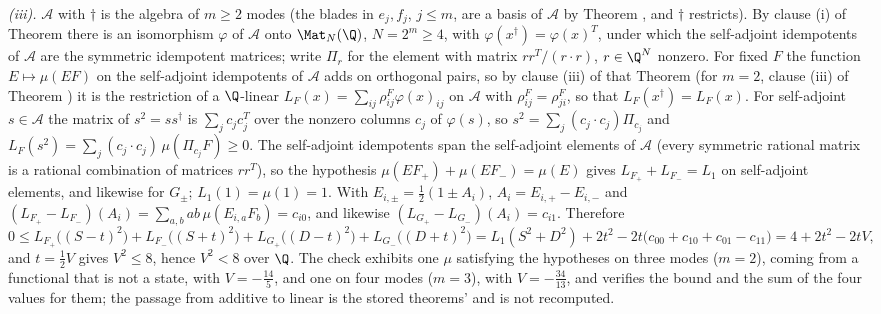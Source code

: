 \emph{(iii).} $\mathcal{A}$ with $\dagger$ is the algebra of $m \ge 2$ modes (the blades in $e_{j}, f_{j}$, $j \le m$, are a basis of $\mathcal{A}$ by Theorem , and $\dagger$ restricts). By clause (i) of Theorem  there is an isomorphism $\varphi$ of $\mathcal{A}$ onto $\Mat_{N}(\Q)$, $N = 2^{m} \ge 4$, with $\varphi(x^{\dagger}) = \varphi(x)^{T}$, under which the self-adjoint idempotents of $\mathcal{A}$ are the symmetric idempotent matrices; write $\Pi_{r}$ for the element with matrix $rr^{T}/(r \cdot r)$, $r \in \Q^{N}$ nonzero. For fixed $F$ the function $E \mapsto \mu(EF)$ on the self-adjoint idempotents of $\mathcal{A}$ adds on orthogonal pairs, so by clause (iii) of that Theorem (for $m = 2$, clause (iii) of Theorem ) it is the restriction of a $\Q$-linear $L_{F}(x) = \sum_{ij}\rho^{F}_{ij}\varphi(x)_{ij}$ on $\mathcal{A}$ with $\rho^{F}_{ij} = \rho^{F}_{ji}$, so that $L_{F}(x^{\dagger}) = L_{F}(x)$. For self-adjoint $s \in \mathcal{A}$ the matrix of $s^{2} = ss^{\dagger}$ is $\sum_{j}c_{j}c_{j}^{T}$ over the nonzero columns $c_{j}$ of $\varphi(s)$, so $s^{2} = \sum_{j}(c_{j} \cdot c_{j})\Pi_{c_{j}}$ and $L_{F}(s^{2}) = \sum_{j}(c_{j} \cdot c_{j})\,\mu(\Pi_{c_{j}}F) \ge 0$. The self-adjoint idempotents span the self-adjoint elements of $\mathcal{A}$ (every symmetric rational matrix is a rational combination of matrices $rr^{T}$), so the hypothesis $\mu(EF_{+}) + \mu(EF_{-}) = \mu(E)$ gives $L_{F_{+}} + L_{F_{-}} = L_{1}$ on self-adjoint elements, and likewise for $G_{\pm}$; $L_{1}(1) = \mu(1) = 1$. With $E_{i,\pm} = \tfrac12(1 \pm A_{i})$, $A_{i} = E_{i,+} - E_{i,-}$ and $(L_{F_{+}} - L_{F_{-}})(A_{i}) = \sum_{a,b}ab\,\mu(E_{i,a}F_{b}) = c_{i0}$, and likewise $(L_{G_{+}} - L_{G_{-}})(A_{i}) = c_{i1}$. Therefore
\[
0 \le L_{F_{+}}\bigl((S - t)^{2}\bigr) + L_{F_{-}}\bigl((S + t)^{2}\bigr) + L_{G_{+}}\bigl((D - t)^{2}\bigr) + L_{G_{-}}\bigl((D + t)^{2}\bigr) = L_{1}(S^{2} + D^{2}) + 2t^{2} - 2t\bigl(c_{00} + c_{10} + c_{01} - c_{11}\bigr) = 4 + 2t^{2} - 2tV ,
\]
and $t = \tfrac12 V$ gives $V^{2} \le 8$, hence $V^{2} < 8$ over $\Q$. The check exhibits one $\mu$ satisfying the hypotheses on three modes ($m = 2$), coming from a functional that is not a state, with $V = -\tfrac{14}{5}$, and one on four modes ($m = 3$), with $V = -\tfrac{34}{13}$, and verifies the bound and the sum of the four values for them; the passage from additive to linear is the stored theorems' and is not recomputed.

